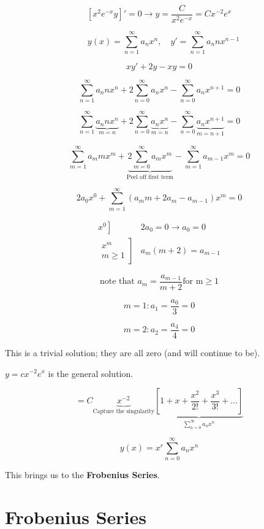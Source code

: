 \documentclass{article}
\begin{document}
$$\left[x^2 e^{-x} y \right]' = 0 \rightarrow y = \frac{C}{x^2 e^{-x}} = C x^{-2} e^x$$


$$\quad y(x) = \sum_{n = 1}^\infty a_n x^n, \quad y' = \sum_{n=1}^\infty a_n n x^{n-1}$$

$$xy' + 2y - xy = 0$$

$$\sum_{n = 1}^{\infty} a_n n x^n + 2 \sum_{n = 0}^{\infty} a_n x^n - \sum_{n = 0}^{\infty} a_n x^{n+1} = 0$$


$$\sum_{n=1}^\infty \underbrace{a_n n x^n}_{m=n} + 2 \sum_{n=0}^\infty \underbrace{a_n x^n}_{m=n} - \sum_{n=0}^\infty \underbrace{a_n x^{n+1}}_{m = n+1} = 0$$

$$\sum_{m=1}^\infty a_m m x^m + \underbrace{2 \sum_{m=0}^\infty a_m x^m}_{\text{Peel off first term}} - \sum_{m=1}^\infty a_{m-1} x^m = 0$$

$$2 a_0 x^0 + \sum_{m=1}^\infty \left(a_m m + 2 a_m - a_{m-1} \right) x^m = 0$$

$$\begin{matrix} \left. x^0 \right] & 2 a_0 = 0 \longrightarrow a_0 = 0 \\
\left. \begin{matrix} x^m \\ m \geq 1 \end{matrix} \right] & a_m (m+2) = a_{m-1} \end{matrix}$$

$$\text{note that } a_m = \frac{a_{m-1}}{m+2} \text{for m} \geq 1$$

$$m = 1: a_1 = \frac{a_0}{3} = 0$$

$$m = 2: a_2 = \frac{a_4}{4} = 0$$

This is a trivial solution; they are all zero (and will continue to be). 

$y = c x^{-2} e^x$ is the general solution. 

$$ = C \underbrace{x^{-2}}_{\text{Capture the singularity}} \underbrace{\left[ 1 + x + \frac{x^2}{2!} + \frac{x^3}{3!} + ... \right]}_{\sum_{n = 0}^{\infty} a_n x^n}$$

$$ y(x) = x^r \sum_{n = 0}^{\infty} a_n x^n$$

This brings us to the \textbf{Frobenius Series}. 

\section{Frobenius Series}
\end{document}
